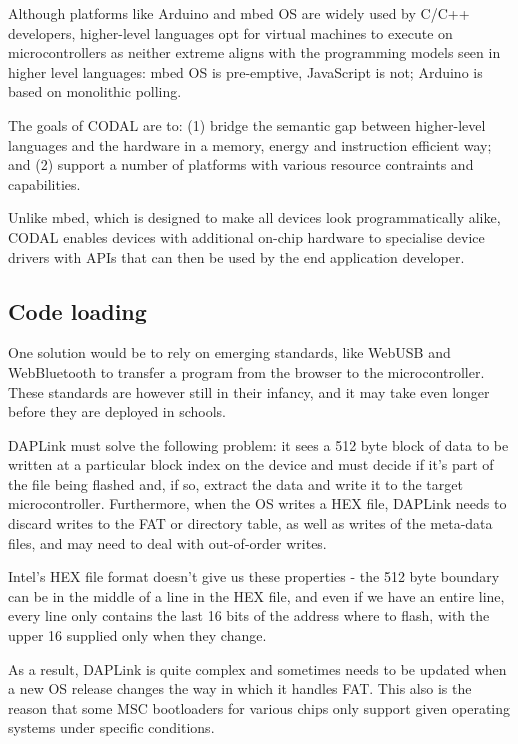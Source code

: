 Although platforms like Arduino and mbed OS are widely used by C/C++ developers, 
higher-level languages opt for virtual machines to execute on microcontrollers 
as neither extreme aligns with the programming models seen in higher level languages: 
mbed OS is pre-emptive, JavaScript is not; Arduino is based on monolithic polling. 

The goals of CODAL are to: (1) bridge the semantic gap between 
higher-level languages and the hardware in a memory, energy and instruction 
efficient way; and (2) support a number of platforms with various
resource contraints and capabilities.

Unlike mbed, which is designed to make all devices look programmatically alike,
CODAL enables devices with additional on-chip hardware to specialise device drivers 
with APIs that can then be used by the end application developer.



\subsection{Code loading}

One solution would be to rely on emerging standards, like WebUSB and WebBluetooth to transfer a program from the browser 
to the microcontroller. These standards are however still in their infancy, and it may take even longer before they are 
deployed in schools.

DAPLink must solve the following problem: it sees a 512 byte block of data to be written
at a particular block index on the device and must decide if it's part of the file being flashed and, if so, extract
the data and write it to the target microcontroller. Furthermore, when the OS writes a HEX file, DAPLink needs to discard
writes to the FAT or directory table, as well as writes of the meta-data files, and may need to deal with out-of-order writes.

Intel's HEX file format doesn't give us these properties 
- the 512 byte boundary can be in the middle of a line in the HEX file, 
and even if we have an entire line, every line only
contains the last 16 bits of the address where to flash, 
with the upper 16 supplied only when they change.

As a result, DAPLink is quite complex and sometimes needs to be updated when a new OS release changes the way
in which it handles FAT. 
This also is the reason that some MSC bootloaders for various chips only support given operating
systems under specific conditions.


